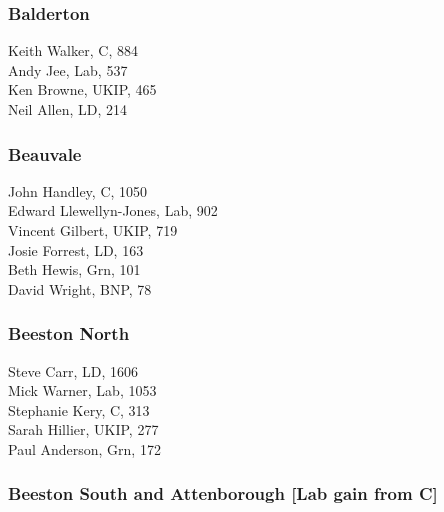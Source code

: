 \documentclass[a4paper,openany,10pt]{book}
\begin{document}
\subsubsection*{Balderton}



Keith Walker, C, 884\\
Andy Jee, Lab, 537\\
Ken Browne, UKIP, 465\\
Neil Allen, LD, 214\\


\subsubsection*{Beauvale}



John Handley, C, 1050\\
{Edward Llewellyn-Jones}, Lab, 902\\
Vincent Gilbert, UKIP, 719\\
Josie Forrest, LD, 163\\
Beth Hewis, Grn, 101\\
David Wright, BNP, 78\\


\subsubsection*{Beeston North}



Steve Carr, LD, 1606\\
Mick Warner, Lab, 1053\\
Stephanie Kery, C, 313\\
Sarah Hillier, UKIP, 277\\
Paul Anderson, Grn, 172\\


\subsubsection*{Beeston South and Attenborough \hspace*{\fill}\nolinebreak[1]%
\enspace\hspace*{\fill}
[Lab gain from C]}

\end{document}
